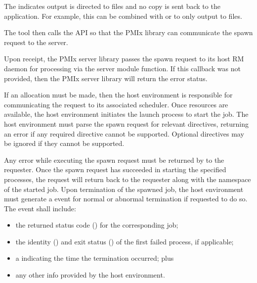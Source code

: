\adviceuserstart
The  indicates output is directed to files and
no copy is sent back to the application.  For example, this can be combined with
 or  to
only output to files.
\adviceuserend

The tool then calls the  \ac{API} so that the \ac{PMIx} library can communicate the spawn request to the server.

Upon receipt, the \ac{PMIx} server library passes the spawn request to its host \ac{RM} daemon for processing via the  server module function. If this callback was not provided, then the \ac{PMIx} server library will return the  error status.

If an allocation must be made, then the host environment is responsible for
communicating the request to its associated scheduler. Once resources are
available, the host environment initiates the launch process to start the job.
The host environment must parse the spawn request for relevant directives,
returning an error if any required directive cannot be supported. Optional
directives may be ignored if they cannot be supported.

Any error while executing the spawn request must be returned by
 to the requester. Once the spawn request has succeeded in
starting the specified processes, the request will return
 back to the requester along with the namespace of the
started job. Upon termination of the spawned job, the host environment must
generate a  event for normal or abnormal
termination if requested to do so. The event shall include:

\begin{itemize}
    \item the returned status code () for the
    corresponding job;
    \item the identity () and exit status
    () of the first failed process, if applicable;
    \item a  indicating the time the termination
    occurred; plus
    \item any other info provided by the host environment.
\end{itemize}

